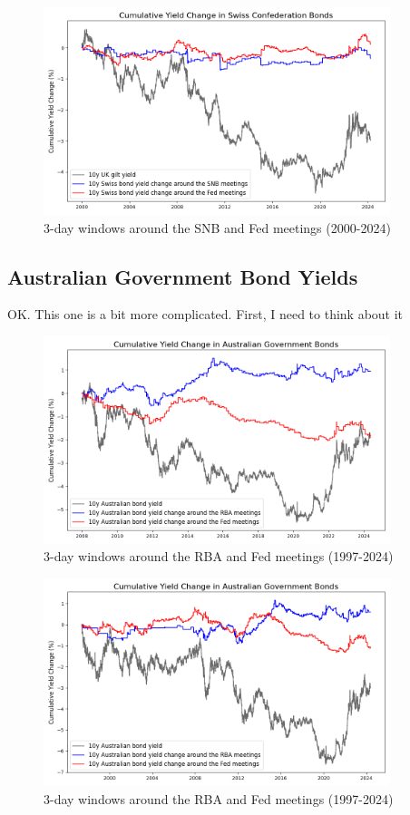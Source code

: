 \begin{figure}[!htbp]
    \centering
    \includegraphics[width=0.9\textwidth]{figures/2000_swiss_bonds_figure1a.png}
    \caption{3-day windows around the SNB and Fed meetings (2000-2024)}
    \label{fig:snb2000}
\end{figure}


\subsection{Australian Government Bond Yields}

OK. This one is a bit more complicated. First, I need to think about it

\begin{figure}[!htbp]
    \centering
    \includegraphics[width=0.9\textwidth]{figures/2008_australian_bonds_figure1a.png}
    \caption{3-day windows around the RBA and Fed meetings (1997-2024)}
    \label{fig:rba2008}
\end{figure}

\begin{figure}[!htbp]
    \centering
    \includegraphics[width=0.9\textwidth]{figures/1997_australian_bonds_figure1a.png}
    \caption{3-day windows around the RBA and Fed meetings (1997-2024)}
    \label{fig:rba1997}
\end{figure}

